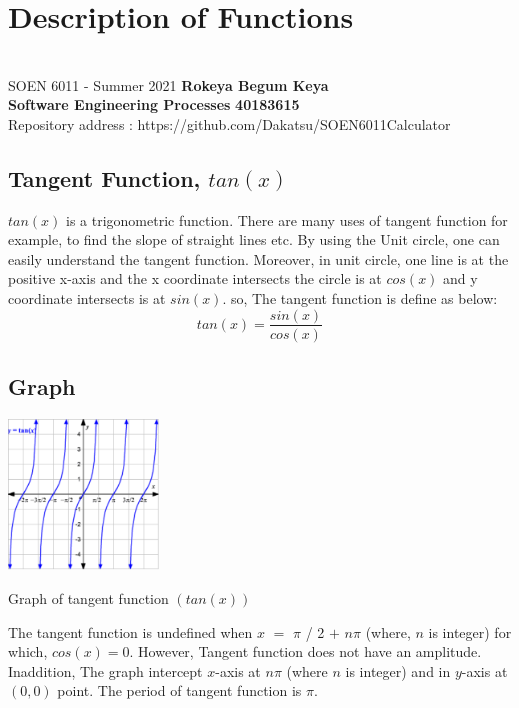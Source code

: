 \documentclass[letterpaper, 11pt]{report}
\begin{document}
\section*{Description of Functions}
\section*{}
\normalsize {SOEN 6011 - Summer 2021} \hfill \textbf{Rokeya Begum Keya} \\
\textbf{ Software Engineering Processes}  \hfill \textbf{40183615} \\
\hfill Repository address : https://github.com/Dakatsu/SOEN6011Calculator
\\
 \subsection*{ Tangent Function, $tan(x)$ } 
 
 \normalsize{ \cite{test1} $tan(x)$ is a trigonometric function. There are many uses of tangent function for example, to find the slope of straight lines etc. By using the Unit circle, one can easily understand the tangent function. Moreover, in unit circle, one line is at the positive x-axis and the x coordinate intersects the circle is at $cos(x)$ and y coordinate intersects is at $sin(x)$. so, The tangent function is define as below: \[tan(x) = \frac{sin(x)}{cos(x)}\]
 }
 
 \subsection*{Graph}
 \begin{center}
\includegraphics[width= 4cm]{tan}
\end{center}
\begin{center}
Graph of tangent function $ (tan(x))$\end{center}
 \normalsize{ \cite{test1} The tangent function is undefined when $x$ $=$ $\pi$ / 2 $+$ $n \pi$ (where, $n$ is integer) for which, $cos(x) = 0$. However, Tangent function does not have an amplitude. Inaddition, The graph intercept $x$-axis at $n\pi$ (where $n$ is integer) and in $y$-axis at $(0,0)$ point. The period of tangent function is $\pi$.
 }
 \\
\end{document}
